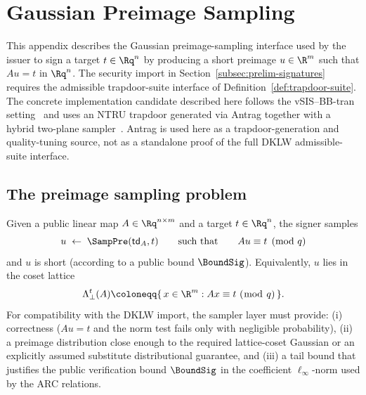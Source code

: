 \section{Gaussian Preimage Sampling}
\label{app:gaussian-sampler}

This appendix describes the Gaussian preimage-sampling interface used by the issuer to sign a target
\(t\in\Rq^n\) by producing a short preimage \(u\in\R^m\) such that \(A u = t\) in \(\Rq^n\).  The security
import in Section~\ref{subsec:prelim-signatures} requires the admissible trapdoor-suite interface of
Definition~\ref{def:trapdoor-suite}.  The concrete implementation candidate described here follows the
vSIS--BB-tran setting~\cite{EPRINT:DKLW25} and uses an NTRU trapdoor generated via Antrag together with
a hybrid two-plane sampler~\cite{EPRINT:ENSTW23}.  Antrag is used here as a trapdoor-generation and
quality-tuning source, not as a standalone proof of the full DKLW admissible-suite interface.

\subsection{The preimage sampling problem}
Given a public linear map \(A\in\Rq^{n\times m}\) and a target \(t\in\Rq^n\), the signer samples
\[
  u \;\gets\; \SampPre(\mathsf{td}_A,t)
  \qquad\text{such that}\qquad
  A u \equiv t \pmod q
\]
and \(u\) is short (according to a public bound \(\BoundSig\)). Equivalently, \(u\) lies in the coset lattice
\[
  \Lambda_{\perp}^{t}(A)\coloneqq \{\,x\in\R^{m} : A x \equiv t\ (\bmod\ q)\,\}.
\]
For compatibility with the DKLW import, the sampler layer must provide:
(i) correctness (\(Au=t\) and the norm test fails only with negligible probability),
(ii) a preimage distribution close enough to the required lattice-coset Gaussian or an explicitly assumed
substitute distributional guarantee,
and (iii) a tail bound that justifies the public verification bound \(\BoundSig\) in the coefficient
\(\ell_\infty\)-norm used by the ARC relations.


